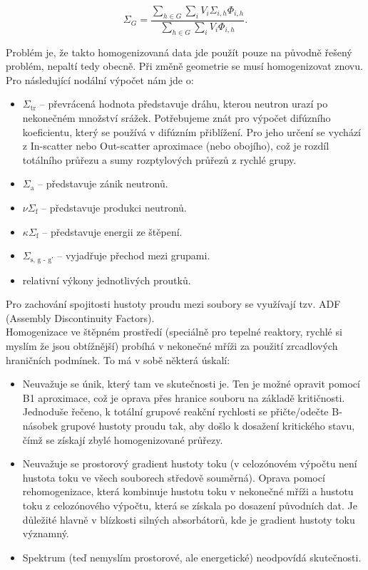 \begin{equation}
  \boxed{
    \Sigma_G = \dfrac{\sum_{h \in G} \sum_i V_i \Sigma_{i,h} \Phi_{i,h}}{\sum_{h \in G} \sum_i V_i \Phi_{i,h}}.}
\end{equation}

Problém je, že takto homogenizovaná data jde použít pouze na původně řešený problém, nepaltí tedy obecně. Při změně geometrie se musí homogenizovat znovu. Pro následující nodální výpočet nám jde o:

\begin{itemize}
  \item $\Sigma_\text{tr}$ -- převrácená hodnota představuje dráhu, kterou neutron urazí po nekonečném množství srážek. Potřebujeme znát pro výpočet difúzního koeficientu, který se používá v difúzním přiblížení. Pro jeho určení se vychází z In-scatter nebo Out-scatter aproximace (nebo obojího), což je rozdíl totálního průřezu a sumy rozptylových průřezů z rychlé grupy.
  \item $\Sigma_\text{a}$ -- představuje zánik neutronů.
  \item $\nu \Sigma_\text{f}$ -- představuje produkci neutronů.
  \item $\kappa \Sigma_\text{f}$ -- představuje energii ze štěpení.
  \item $\Sigma_\text{s, g - g'}$ -- vyjadřuje přechod mezi grupami. 
  \item relativní výkony jednotlivých proutků.
\end{itemize}

Pro zachování spojitosti hustoty proudu mezi soubory se využívají tzv. ADF (Assembly Discontinuity Factors).\\

Homogenizace ve štěpném prostředí (speciálně pro tepelné reaktory, rychlé si myslím že jsou obtížnější) probíhá v nekonečné mříži za použití zrcadlových hraničních podmínek. To má v sobě některá úskalí:

\begin{itemize}
  \item Neuvažuje se únik, který tam ve skutečnosti je. Ten je možné opravit pomocí B1 aproximace, což je oprava přes hranice souboru na základě kritičnosti. Jednoduše řečeno, k totální grupové reakční rychlosti se přičte/odečte B-násobek grupové hustoty proudu tak, aby došlo k dosažení kritického stavu, čímž se získají zbylé homogenizované průřezy.
  \item Neuvažuje se prostorový gradient hustoty toku (v celozónovém výpočtu není hustota toku ve všech souborech středově souměrná). Oprava pomocí rehomogenizace, která kombinuje hustotu toku v nekonečné mříži a hustotu toku z celozónového výpočtu, která se získala po dosazení původních dat. Je důležité hlavně v blízkosti silných absorbátorů, kde je gradient hustoty toku významný.
  \item Spektrum (teď nemyslím prostorové, ale energetické) neodpovídá skutečnosti.
\end{itemize}

